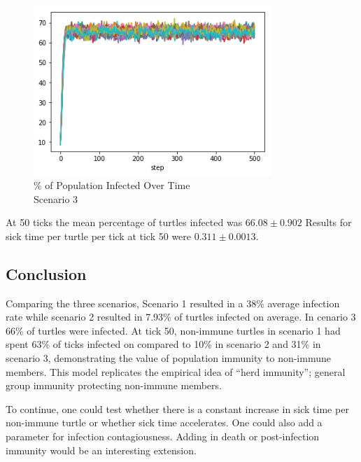 \documentclass[11pt]{article} %
\begin{document}
\begin{figure}
\centering
\includegraphics[width=0.8\textwidth]{20-runs-scenario-3-steady-state}
\caption{\% of Population Infected Over Time \\ Scenario 3}
\end{figure}


At 50 ticks the mean percentage of turtles infected was $66.08 \pm 0.902$ Results for sick time per turtle per tick at tick 50 were $0.311 \pm 0.0013$.


\subsection{Conclusion}

Comparing the three scenarios, Scenario 1 resulted in a 38\% average infection rate while scenario 2 resulted in 7.93\% of turtles infected on average. In cenario 3  66\% of turtles were infected. At tick 50, non-immune turtles in scenario 1 had spent 63\% of ticks infected on compared to 10\% in scenario 2 and 31\% in scenario 3, demonstrating the value of population immunity to non-immune members.  This model replicates the empirical idea of ``herd immunity''; general group immunity protecting non-immune members. 

To continue, one could test whether there is a constant increase in sick time per non-immune turtle or whether  sick time accelerates. One could also add  a parameter for infection contagiousness. Adding in death or post-infection immunity would be an interesting extension. 




\pagebreak
\end{document}
